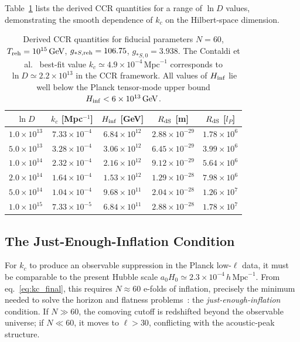 Table~\ref{tab:derived_quantities} lists the derived CCR quantities for a
range of $\ln D$ values, demonstrating the smooth dependence of $k_c$ on
the Hilbert-space dimension.

\begin{table}[t]
  \centering
  \begin{tabular}{ccccc}
    \hline\hline
    $\ln D$ & $k_c$ [Mpc$^{-1}$] & $H_{\rm inf}$ [GeV]
      & $R_{\rm dS}$ [m] & $R_{\rm dS}$ [$l_P$] \\
    \hline
    $1.0\times 10^{13}$ & $7.33\times 10^{-4}$ & $6.84\times 10^{12}$
      & $2.88\times 10^{-29}$ & $1.78\times 10^{6}$ \\
    $5.0\times 10^{13}$ & $3.28\times 10^{-4}$ & $3.06\times 10^{12}$
      & $6.45\times 10^{-29}$ & $3.99\times 10^{6}$ \\
    $1.0\times 10^{14}$ & $2.32\times 10^{-4}$ & $2.16\times 10^{12}$
      & $9.12\times 10^{-29}$ & $5.64\times 10^{6}$ \\
    $2.0\times 10^{14}$ & $1.64\times 10^{-4}$ & $1.53\times 10^{12}$
      & $1.29\times 10^{-28}$ & $7.98\times 10^{6}$ \\
    $5.0\times 10^{14}$ & $1.04\times 10^{-4}$ & $9.68\times 10^{11}$
      & $2.04\times 10^{-28}$ & $1.26\times 10^{7}$ \\
    $1.0\times 10^{15}$ & $7.33\times 10^{-5}$ & $6.84\times 10^{11}$
      & $2.88\times 10^{-28}$ & $1.78\times 10^{7}$ \\
    \hline\hline
  \end{tabular}
  \caption{Derived CCR quantities for fiducial parameters $N = 60$,
    $T_{\rm reh} = 10^{15}\,\mathrm{GeV}$,
    $g_{*S,\rm reh} = 106.75$, $g_{*S,0} = 3.938$.
    The Contaldi et al.\ \cite{Contaldi:2003} best-fit value
    $k_c \simeq 4.9\times 10^{-4}\,\mathrm{Mpc}^{-1}$ corresponds to
    $\ln D \simeq 2.2\times 10^{13}$ in the CCR framework.
    All values of $H_{\rm inf}$ lie well below the Planck tensor-mode
    upper bound $H_{\rm inf} < 6\times 10^{13}\,\mathrm{GeV}$.}
  \label{tab:derived_quantities}
\end{table}

\subsection{The Just-Enough-Inflation Condition}
\label{subsec:just_enough}

For $k_c$ to produce an observable suppression in the Planck low-$\ell$ data,
it must be comparable to the present Hubble scale
$a_0 H_0 \simeq 2.3\times 10^{-4}\,h\,\mathrm{Mpc}^{-1}$.
From eq.~\eqref{eq:kc_final}, this requires $N \approx 60$ e-folds of
inflation, precisely the minimum needed to solve the horizon and flatness
problems~\cite{Baumann:2009}: the \emph{just-enough-inflation} condition.
If $N \gg 60$, the comoving cutoff is redshifted beyond the observable
universe; if $N \ll 60$, it moves to $\ell > 30$, conflicting with the
acoustic-peak structure.

